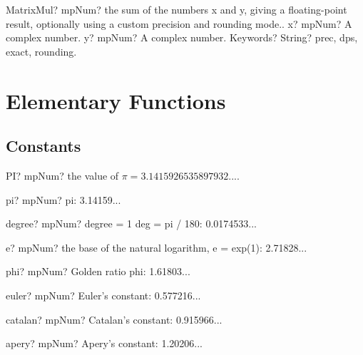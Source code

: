 \documentclass[12pt,a4paper,openany]{book}
\begin{document}
\begin{mpFunctionsExtract}
\mpFunctionThree
{MatrixMul? mpNum? the sum of the numbers x and y, giving a floating-point result, optionally using a custom precision and rounding mode..}
{x? mpNum? A complex number.}
{y? mpNum? A complex number.}
{Keywords? String? prec, dps, exact, rounding.}
\end{mpFunctionsExtract}

\chapter{Elementary Functions}

\section{Constants}

\begin{mpFunctionsExtract}
\mpWorksheetFunctionZero
{PI? mpNum? the value of $\pi = 3.1415926535897932...$.}
\end{mpFunctionsExtract}

\begin{mpFunctionsExtract}
\mpFunctionZero
{pi? mpNum?  pi: 3.14159...}
\end{mpFunctionsExtract}

\begin{mpFunctionsExtract}
\mpFunctionZero
{degree? mpNum?  degree = 1 deg = pi / 180: 0.0174533...}
\end{mpFunctionsExtract}

\begin{mpFunctionsExtract}
\mpFunctionZero
{e? mpNum?  the base of the natural logarithm, e = exp(1): 2.71828...}
\end{mpFunctionsExtract}

\begin{mpFunctionsExtract}
\mpFunctionZero
{phi? mpNum?  Golden ratio phi: 1.61803...}
\end{mpFunctionsExtract}

\begin{mpFunctionsExtract}
\mpFunctionZero
{euler? mpNum?  Euler's constant: 0.577216...}
\end{mpFunctionsExtract}

\begin{mpFunctionsExtract}
\mpFunctionZero
{catalan? mpNum?  Catalan's constant: 0.915966...}
\end{mpFunctionsExtract}

\begin{mpFunctionsExtract}
\mpFunctionZero
{apery? mpNum?  Apery's constant: 1.20206...}
\end{mpFunctionsExtract}
\end{document}
